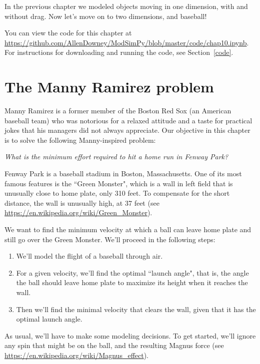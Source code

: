 \documentclass[12pt]{book}
\theoremstyle{exercise}
\begin{document}
In the previous chapter we modeled objects moving in one dimension, with and without drag.  Now let's move on to two dimensions, and baseball!

You can view the code for this chapter at \url{https://github.com/AllenDowney/ModSimPy/blob/master/code/chap10.ipynb}.  For instructions for downloading and running the code, see Section~\ref{code}.


\section{The Manny Ramirez problem}
\label{manny}

Manny Ramirez is a former member of the Boston Red Sox (an American baseball team) who was notorious for a relaxed attitude and a taste for practical jokes that his managers did not always appreciate.  Our objective in this chapter is to solve the following Manny-inspired problem:

{\it What is the minimum effort required to hit a home run in Fenway Park?}

Fenway Park is a baseball stadium in Boston, Massachusetts.  One of its most famous features is the ``Green Monster", which is a wall in left field that is unusually close to home plate, only 310 feet.  To compensate for the short distance, the wall is unusually high, at 37 feet (see \url{https://en.wikipedia.org/wiki/Green_Monster}).

We want to find the minimum velocity at which a ball can leave home plate and still go over the Green Monster.  We'll proceed in the following steps:

\begin{enumerate}

\item We'll model the flight of a baseball through air.

\item For a given velocity, we'll find the optimal ``launch angle", that is, the angle the ball should leave home plate to maximize its height when it reaches the wall.

\item Then we'll find the minimal velocity that clears the wall, given that it has the optimal launch angle.

\end{enumerate}

As usual, we'll have to make some modeling decisions.  To get started, we'll ignore any spin that might be on the ball, and the resulting Magnus force (see \url{https://en.wikipedia.org/wiki/Magnus_effect}).
\end{document}
